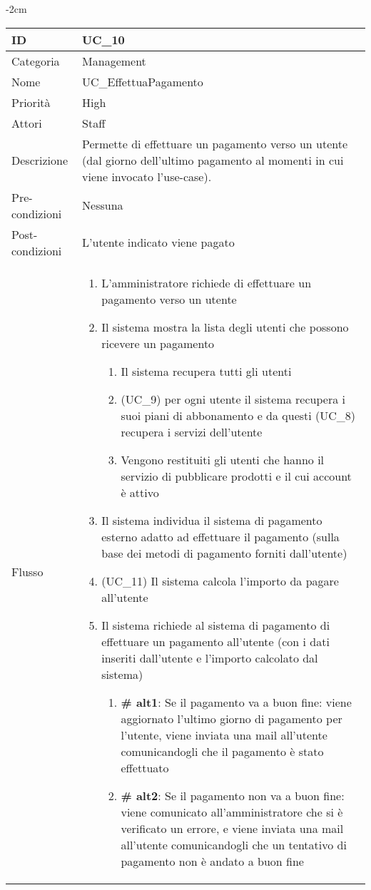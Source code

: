 \begin{center}
\begin{table}[bp]
    \centering
    \addtolength{\leftskip} {-2cm}
\begin{tabular}{ |p{2.6cm}|p{13cm}|  }
\hline
ID & UC\_10 \\\hline
Categoria & Management\\\hline
Nome & UC\_EffettuaPagamento\\\hline
Priorità & High \\\hline
Attori &  Staff \\\hline
Descrizione & Permette di effettuare un pagamento verso un utente (dal giorno dell'ultimo pagamento al momenti in cui viene invocato l'use-case).\\\hline
Pre-condizioni &  Nessuna\\\hline
Post-condizioni &  L'utente indicato viene pagato\\\hline
Flusso &  	
		\vspace{-5mm} \begin{enumerate}	
		\item L'amministratore richiede di effettuare un pagamento verso un utente
		\item Il sistema mostra la lista degli utenti che possono ricevere un pagamento
			\begin{enumerate}[  ]
			\item Il sistema recupera tutti gli utenti
			\item (UC\_9) per ogni utente il sistema recupera i suoi piani di abbonamento e da questi (UC\_8) recupera i servizi dell'utente
			\item Vengono restituiti gli utenti che hanno il servizio di pubblicare prodotti e il cui account è attivo
			\end{enumerate}
		\item Il sistema individua il sistema di pagamento esterno adatto ad effettuare il pagamento (sulla base dei metodi di pagamento forniti dall'utente)
		\item (UC\_11) Il sistema calcola l'importo da pagare all'utente
		\item Il sistema richiede al sistema di pagamento di effettuare un pagamento all'utente (con i dati inseriti dall'utente e l'importo calcolato dal sistema)
			\begin{enumerate}[  ]
			\item \textbf{\# alt1}: Se il pagamento va a buon fine: viene aggiornato l'ultimo giorno di pagamento per l'utente, viene inviata una mail all'utente comunicandogli che il pagamento è stato effettuato
			\item \textbf{\# alt2}: Se il pagamento non va a buon fine: viene comunicato all'amministratore che si è verificato un errore, e viene inviata una mail all'utente comunicandogli che un tentativo di pagamento non è andato a buon fine
			\end{enumerate}
		\end{enumerate}\\\hline
\end{tabular}
\label{table_use_case:10}\newline
\end{table}


\end{center}
